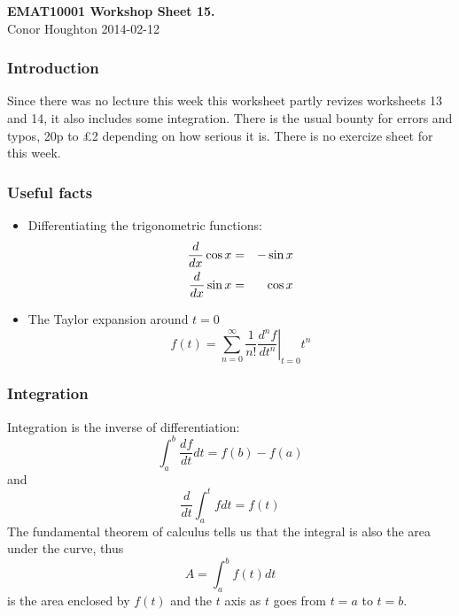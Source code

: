 \documentclass[12pt]{article}
\begin{document}
\begin{center}
{\bf EMAT10001 Workshop Sheet 15.}\\[1cm]{} Conor Houghton 2014-02-12
\end{center}
\subsubsection*{Introduction} 
Since there was no lecture this week this worksheet partly revizes
worksheets 13 and 14, it also includes some integration. There is the
usual bounty for errors and typos, 20p to \pounds 2 depending on how
serious it is. There is no exercize sheet for this week.

\subsubsection*{Useful facts}
\begin{itemize}
\item Differentiating the trigonometric functions:
\begin{eqnarray}
\frac{d}{dx}\cos{x}&=&-\sin{x}\cr
\frac{d}{dx}\sin{x}&=&\cos{x}
\end{eqnarray}
\item The Taylor expansion around $t=0$
\begin{equation}
f(t)=\sum_{n=0}^\infty\frac{1}{n!}\left.\frac{d^nf}{dt^n}\right|_{t=0}t^n
\end{equation}
\end{itemize}
\subsubsection*{Integration}
Integration is the inverse of differentiation:
\begin{equation}
\int_a^b \frac{df}{dt}dt=f(b)-f(a)
\end{equation}
and
\begin{equation}
\frac{d}{dt}\int_a^tfdt=f(t)
\end{equation}
The fundamental theorem of calculus tells us that the integral is also
the area under the curve, thus
\begin{equation}
A=\int_a^b f(t)dt
\end{equation}
is the area enclosed by $f(t)$ and the $t$ axis as $t$ goes from $t=a$
to $t=b$. 
\end{document}
